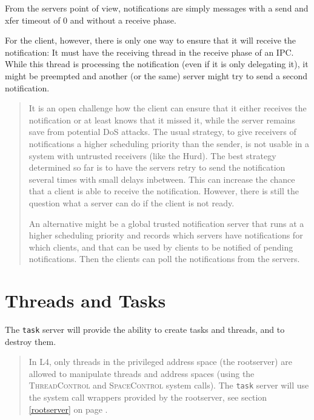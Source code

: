 \documentclass[9pt,a4paper]{extarticle}
\newenvironment{comment}{\footnotesize \begin{quote}}{\end{quote}}
\begin{document}
From the servers point of view, notifications are simply messages with
a send and xfer timeout of 0 and without a receive phase.

For the client, however, there is only one way to ensure that it will
receive the notification: It must have the receiving thread in the
receive phase of an IPC.  While this thread is processing the
notification (even if it is only delegating it), it might be preempted
and another (or the same) server might try to send a second
notification.

\begin{comment}
  It is an open challenge how the client can ensure that it either
  receives the notification or at least knows that it missed it, while
  the server remains save from potential DoS attacks.  The usual
  strategy, to give receivers of notifications a higher scheduling
  priority than the sender, is not usable in a system with untrusted
  receivers (like the Hurd).  The best strategy determined so far is
  to have the servers retry to send the notification several times
  with small delays inbetween.  This can increase the chance that a
  client is able to receive the notification.  However, there is still
  the question what a server can do if the client is not ready.
 
  An alternative might be a global trusted notification server that
  runs at a higher scheduling priority and records which servers have
  notifications for which clients, and that can be used by clients to
  be notified of pending notifications.  Then the clients can poll the
  notifications from the servers.
\end{comment}


\section{Threads and Tasks}

The \texttt{task} server will provide the ability to create tasks and
threads, and to destroy them.

\begin{comment}
  In L4, only threads in the privileged address space (the rootserver)
  are allowed to manipulate threads and address spaces (using the
  \textsc{ThreadControl} and \textsc{SpaceControl} system calls).  The
  \texttt{task} server will use the system call wrappers provided by
  the rootserver, see section \ref{rootserver} on page
  \pageref{rootserver}.
\end{comment}
\end{document}
